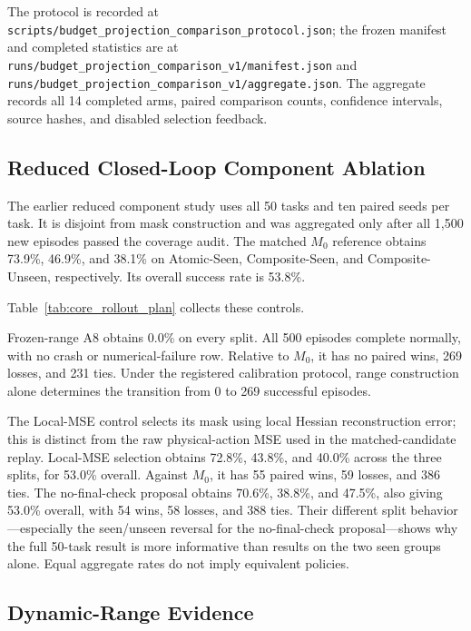 The protocol is recorded at \nolinkurl{scripts/budget_projection_comparison_protocol.json}; the frozen manifest and completed statistics are at \nolinkurl{runs/budget_projection_comparison_v1/manifest.json} and \nolinkurl{runs/budget_projection_comparison_v1/aggregate.json}. The aggregate records all 14 completed arms, paired comparison counts, confidence intervals, source hashes, and disabled selection feedback.

\subsection{Reduced Closed-Loop Component Ablation}
\label{sec:component_rollout_detail}

The earlier reduced component study uses all 50 tasks and ten paired seeds per task. It is disjoint from mask construction and was aggregated only after all 1,500 new episodes passed the coverage audit. The matched $M_0$ reference obtains 73.9\%, 46.9\%, and 38.1\% on Atomic-Seen, Composite-Seen, and Composite-Unseen, respectively. Its overall success rate is 53.8\%.



Table~\ref{tab:core_rollout_plan} collects these controls.

Frozen-range A8 obtains 0.0\% on every split. All 500 episodes complete normally, with no crash or numerical-failure row. Relative to $M_0$, it has no paired wins, 269 losses, and 231 ties. Under the registered calibration protocol, range construction alone determines the transition from 0 to 269 successful episodes.

The Local-MSE control selects its mask using local Hessian reconstruction error; this is distinct from the raw physical-action MSE used in the matched-candidate replay. Local-MSE selection obtains 72.8\%, 43.8\%, and 40.0\% across the three splits, for 53.0\% overall. Against $M_0$, it has 55 paired wins, 59 losses, and 386 ties. The no-final-check proposal obtains 70.6\%, 38.8\%, and 47.5\%, also giving 53.0\% overall, with 54 wins, 58 losses, and 388 ties. Their different split behavior---especially the seen/unseen reversal for the no-final-check proposal---shows why the full 50-task result is more informative than results on the two seen groups alone. Equal aggregate rates do not imply equivalent policies.

\subsection{Dynamic-Range Evidence}
\label{sec:dynamic_range_visualization}


